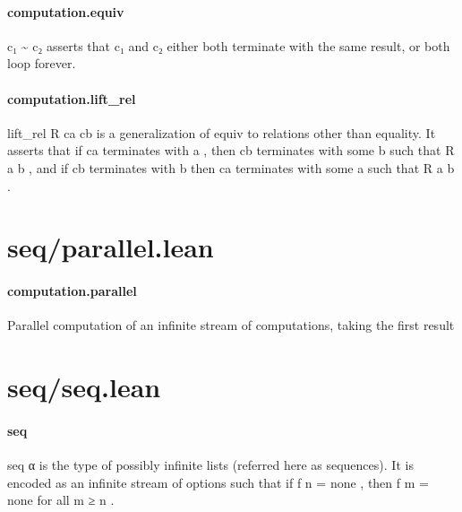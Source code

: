 \documentclass{article}
\begin{document}
\paragraph{computation.equiv}
\par
\colorbox[RGB]{253,246,227}{{{{\color[RGB]{101, 123, 131} c₁ \textasciitilde{} c₂ }}}} asserts that 
\colorbox[RGB]{253,246,227}{{{{\color[RGB]{101, 123, 131} c₁ }}}} and 
\colorbox[RGB]{253,246,227}{{{{\color[RGB]{101, 123, 131} c₂ }}}} either both terminate with the same result,
or both loop forever.
\paragraph{computation.lift\_rel}
\par
\colorbox[RGB]{253,246,227}{{{{\color[RGB]{101, 123, 131} lift\_rel R ca cb }}}} is a generalization of 
\colorbox[RGB]{253,246,227}{{{{\color[RGB]{101, 123, 131} equiv }}}} to relations other than
equality. It asserts that if 
\colorbox[RGB]{253,246,227}{{{{\color[RGB]{101, 123, 131} ca }}}} terminates with 
\colorbox[RGB]{253,246,227}{{{{\color[RGB]{101, 123, 131} a }}}}, then 
\colorbox[RGB]{253,246,227}{{{{\color[RGB]{101, 123, 131} cb }}}} terminates with
some 
\colorbox[RGB]{253,246,227}{{{{\color[RGB]{101, 123, 131} b }}}} such that 
\colorbox[RGB]{253,246,227}{{{{\color[RGB]{101, 123, 131} R a b }}}}, and if 
\colorbox[RGB]{253,246,227}{{{{\color[RGB]{101, 123, 131} cb }}}} terminates with 
\colorbox[RGB]{253,246,227}{{{{\color[RGB]{101, 123, 131} b }}}} then 
\colorbox[RGB]{253,246,227}{{{{\color[RGB]{101, 123, 131} ca }}}} terminates
with some 
\colorbox[RGB]{253,246,227}{{{{\color[RGB]{101, 123, 131} a }}}} such that 
\colorbox[RGB]{253,246,227}{{{{\color[RGB]{101, 123, 131} R a b }}}}.
\section{seq/parallel.lean}\paragraph{computation.parallel}
\par
Parallel computation of an infinite stream of computations,
taking the first result
\section{seq/seq.lean}\paragraph{seq}
\par
\colorbox[RGB]{253,246,227}{{{{\color[RGB]{101, 123, 131} seq α }}}} is the type of possibly infinite lists (referred here as sequences).
It is encoded as an infinite stream of options such that if 
\colorbox[RGB]{253,246,227}{{{{\color[RGB]{101, 123, 131} f n  }}}{{{\color[RGB]{181, 137, 0} = }}}{{{\color[RGB]{101, 123, 131}  none }}}}, then
\colorbox[RGB]{253,246,227}{{{{\color[RGB]{101, 123, 131} f m  }}}{{{\color[RGB]{181, 137, 0} = }}}{{{\color[RGB]{101, 123, 131}  none }}}} for all 
\colorbox[RGB]{253,246,227}{{{{\color[RGB]{101, 123, 131} m  }}}{{{\color[RGB]{181, 137, 0} ≥ }}}{{{\color[RGB]{101, 123, 131}  n }}}}.
\end{document}
